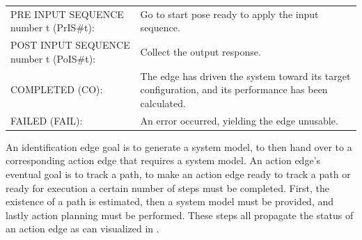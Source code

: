 \noindent
\begin{table}[H]
\centering
\begin{tabular}%
  {>{\raggedleft\arraybackslash}p{}%
   >{\raggedright\arraybackslash}p{}}
PRE INPUT SEQUENCE number t (PrIS\#t): & Go to start pose ready to apply the input sequence. \\
POST INPUT SEQUENCE number t (PoIS\#t): & Collect the output response. \\
COMPLETED (CO): & The edge has driven the system toward its target configuration, and its performance has been calculated. \\
FAILED (FAIL): & An error occurred, yielding the edge unusable. \\
\end{tabular}
\end{table}

An identification edge goal is to generate a system model, to then hand over to a corresponding action edge that requires a system model. An action edge's eventual goal is to track a path, to make an action edge ready to track a path or ready for execution a certain number of steps must be completed. First, the existence of a path is estimated, then a system model must be provided, and lastly action planning must be performed. These steps all propagate the status of an action edge as can visualized in .\bs


